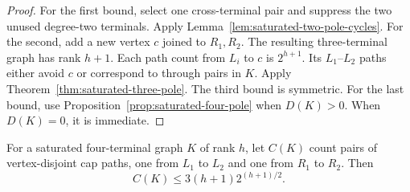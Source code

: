 \begin{proof}
For the first bound, select one cross-terminal pair and suppress the two unused degree-two terminals.
Apply Lemma~\ref{lem:saturated-two-pole-cycles}.
For the second, add a new vertex $c$ joined to $R_1,R_2$.
The resulting three-terminal graph has rank $h+1$.
Each path count from $L_i$ to $c$ is $2^{h+1}$.
Its $L_1$--$L_2$ paths either avoid $c$ or correspond to through pairs in $K$.
Apply Theorem~\ref{thm:saturated-three-pole}.
The third bound is symmetric.
For the last bound, use Proposition~\ref{prop:saturated-four-pole} when $D(K)>0$.
When $D(K)=0$, it is immediate.
\end{proof}

\begin{lemma}\label{lem:saturated-four-pole-double-cap}
For a saturated four-terminal graph $K$ of rank $h$, let $C(K)$ count pairs
of vertex-disjoint cap paths, one from $L_1$ to $L_2$ and one from $R_1$ to $R_2$.
Then
\[
 C(K)\le3(h+1)2^{(h+1)/2}.
\]
\end{lemma}

